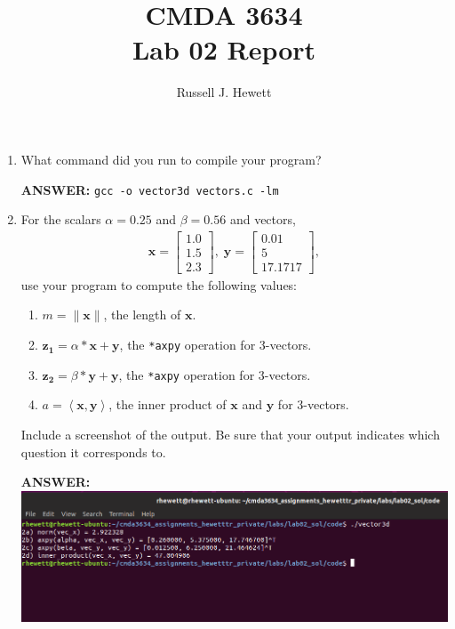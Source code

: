\documentclass[letter]{article}
\title{CMDA 3634 \\ Lab 02 Report}
\author{Russell J. Hewett}
\renewcommand{\vec}[1]{\ensuremath{\boldsymbol{#1}}} %
\begin{document}
\maketitle

\begin{enumerate}
    \item What command did you run to compile your program?
    
    \textbf{ANSWER:} \texttt{gcc -o vector3d vectors.c -lm}

    \item For the scalars $\alpha=0.25$ and $\beta = 0.56$ and vectors,
        \begin{align*}
            \vec{x} = \left[\begin{array}{r} 1.0 \\ 1.5 \\ 2.3 \end{array}\right], \;
            \vec{y} = \left[\begin{array}{r} 0.01 \\ 5 \\ 17.1717 \end{array}\right],
        \end{align*}
        use your program to compute the following values:
        \begin{enumerate}
            \item $m = \lVert\vec{x}\rVert$, the length of $\vec{x}$.
            \item $\vec{z_1} = \alpha * \vec{x} + \vec{y}$, the \texttt{*axpy} operation for 3-vectors.
            \item $\vec{z_2} = \beta * \vec{y} + \vec{y}$, the \texttt{*axpy} operation for 3-vectors.
            \item $a = \left<\vec{x}, \vec{y}\right>$, the inner product of $\vec{x}$ and $\vec{y}$ for 3-vectors.
        \end{enumerate}
        Include a screenshot of the output.  Be sure that your output indicates which question it corresponds to.
    
    \textbf{ANSWER:}\\
    \includegraphics[scale=0.4]{screenshot.png}


\end{enumerate}
\end{document}
